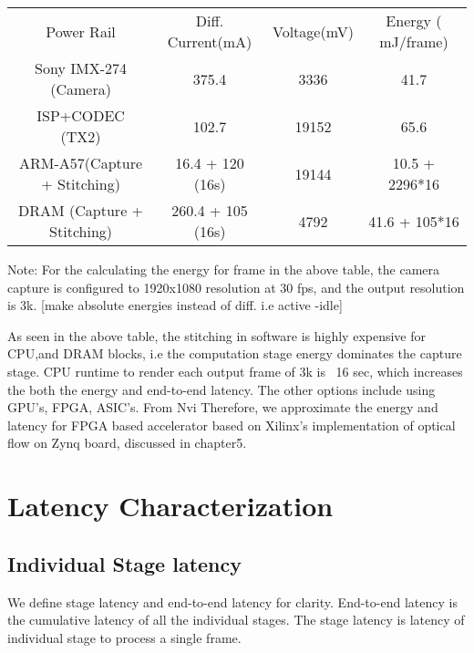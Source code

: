 	\begin{tabular}{c|c|c|c}
	Power Rail & Diff. Current(mA) & Voltage(mV) & Energy ( mJ/frame) \\
	Sony IMX-274 (Camera) & 375.4 & 3336 & 41.7 \\
	ISP+CODEC (TX2) & 102.7 & 19152 & 65.6 \\
	ARM-A57(Capture + Stitching) & 16.4 + 120 (16s) & 19144 & 10.5 + 2296*16\\
	DRAM (Capture + Stitching)  & 260.4 + 105 (16s)  & 4792 & 41.6 + 105*16 \\
	\end{tabular} \newline \newline

	Note: For the calculating the energy for frame in the above table, the camera capture is configured to 1920x1080 resolution at 30 fps, and the output resolution is 3k. [make absolute energies instead of diff. i.e active -idle]\newline
	
	As seen in the above table, the stitching in software is highly expensive for CPU,and DRAM blocks, i.e the computation stage energy dominates the capture stage. CPU runtime to render each output frame of 3k is ~16 sec, which increases the both the energy and end-to-end latency. The other options include using GPU's, FPGA, ASIC's. From Nvi   Therefore, we approximate the energy and latency for FPGA based accelerator based on Xilinx's implementation of optical flow on Zynq board, discussed in chapter5.\newline

\section{Latency Characterization}

\subsection{Individual Stage latency}
We define stage latency and end-to-end latency for clarity. End-to-end latency is the cumulative latency of all the individual stages. The stage latency is latency of individual stage to process a single frame. 

